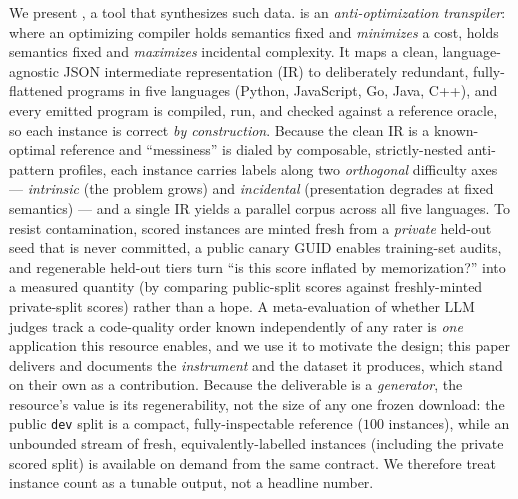 We present \tool, a tool that synthesizes such data. \tool{} is an
\emph{anti-optimization transpiler}: where an optimizing compiler holds semantics fixed
and \emph{minimizes} a cost, \tool{} holds semantics fixed and \emph{maximizes} incidental complexity. It maps a clean, language-agnostic JSON
intermediate representation (IR) to deliberately redundant, fully-flattened programs in
five languages (Python, JavaScript, Go, Java, C++), and every emitted program is
compiled, run, and checked against a reference oracle, so each instance is correct
\emph{by construction}. Because the clean IR is a known-optimal reference and
``messiness'' is dialed by composable, strictly-nested anti-pattern profiles, each
instance carries labels along two \emph{orthogonal} difficulty axes --- \emph{intrinsic}
(the problem grows) and \emph{incidental} (presentation degrades at fixed
semantics) --- and a single IR yields a parallel corpus across all five languages. To
resist contamination, scored instances are minted fresh from a \emph{private} held-out
seed that is never committed, a public canary GUID enables training-set audits, and
regenerable held-out tiers turn ``is this score inflated by memorization?'' into a measured
quantity (by comparing public-split scores against freshly-minted private-split scores)
rather than a hope. A meta-evaluation of whether LLM judges track a code-quality order known independently of
any rater is \emph{one} application this resource enables, and we use it to motivate the
design; this paper delivers and documents the \emph{instrument} and the dataset it
produces, which stand on their own as a contribution. Because the deliverable is a
\emph{generator}, the resource's value is its regenerability, not the size of any one
frozen download: the public \texttt{dev} split is a compact, fully-inspectable reference
($100$ instances), while an unbounded stream of fresh, equivalently-labelled instances
(including the private scored split) is available on demand from the same
contract. We therefore treat instance count as a tunable output, not a headline number.

